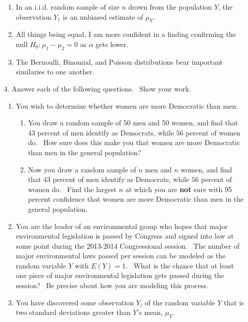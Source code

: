 \documentclass[11pt]{article}
\begin{document}
\begin{enumerate}
\begin{enumerate}
\item In an i.i.d. random sample of size $n$ drawn from the population $Y$,
the observation $Y_{1}$ is an unbiased estimate of $\mu _{Y}.$

\item All things being equal, I am more confident in a finding confirming
the null $H_{0}:\mu _{1}-\mu _{2}=0$ as $\alpha $ gets lower.

\item The Bernoulli, Binomial, and Poisson distributions bear important
similaries to one another.\newpage
\end{enumerate}

\item[4.] Answer each of the following questions. \ Show your work. \ 

\begin{enumerate}
\item You wish to determine whether women are more Democratic than men. \ 

\begin{enumerate}
\item You draw a random sample of 50 men and 50 women, and find that $43$
percent of men identify as Democrats, while $56$ percent of women do. \ How
sure does this make you that women are more Democratic than men in the
general population?

\item Now you draw a random sample of $n$ men and $n$ women, and find that $%
43$ percent of men identify as Democrats, while $56$ percent of women do. \
Find the largest $n$ at which you are \textbf{not} sure with 95 percent
confidence that women are more Democratic than men in the general
population. \ \bigskip
\end{enumerate}

\item You are the leader of an environmental group who hopes that major
environmental legislation is passed by Congress and signed into law at some
point during the 2013-2014 Congressional session. \ The number of major
environmental laws passed per session can be modeled as the random variable $%
Y$ with $E\left( Y\right) =1.$ \ What is the chance that at least one piece
of major environmental legislation gets passed during the session? \ Be
precise about how you are modeling this process. \bigskip

\item You have discovered some observation $Y_{i}$ of the random variable $Y$
that is two standard deviations greater than $Y$'s mean, $\mu _{Y}.$ \  


\end{enumerate}
\end{enumerate}
\end{document}
